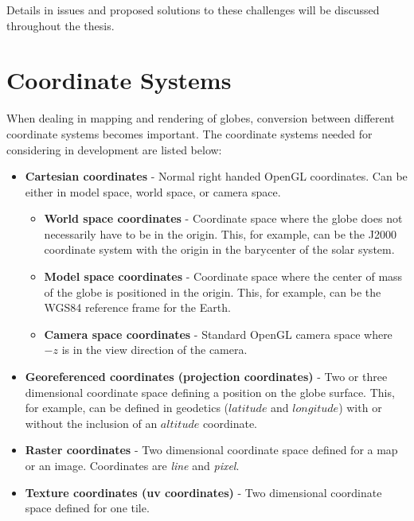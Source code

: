 Details in issues and proposed solutions to these challenges will be discussed throughout the thesis.

\section{Coordinate Systems}

When dealing in mapping and rendering of globes, conversion between different coordinate systems becomes important. The coordinate systems needed for considering in development are listed below:

\begin{itemize}
\item \textbf{Cartesian coordinates} - Normal right handed OpenGL coordinates. Can be either in model space, world space, or camera space.

\begin{itemize}
\item \textbf{World space coordinates} - Coordinate space where the globe does not necessarily have to be in the origin. This, for example, can be the J2000 coordinate system with the origin in the barycenter of the solar system.
\item \textbf{Model space coordinates} - Coordinate space where the center of mass of the globe is positioned in the origin. This, for example, can be the WGS84 reference frame for the Earth.
\item \textbf{Camera space coordinates} - Standard OpenGL camera space where $-z$ is in the view direction of the camera.
\end{itemize}

\item \textbf{Georeferenced coordinates (projection coordinates)} - Two or three dimensional coordinate space defining a position on the globe surface. This, for example, can be defined in geodetics ($latitude$ and $longitude$) with or without the inclusion of an $altitude$ coordinate.

\item \textbf{Raster coordinates} - Two dimensional coordinate space defined for a map or an image. Coordinates are \emph{line} and \emph{pixel}.

\item \textbf{Texture coordinates (uv coordinates)} - Two dimensional coordinate space defined for one tile.

\end{itemize}

